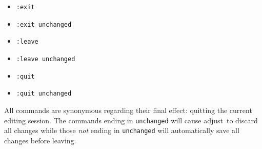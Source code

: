 \documentclass[11pt, a4paper, british]{scrartcl}
\DeclareRobustCommand{\adjust}{\textsf{adjust}}
\begin{document}
\begin{itemize}
\item \texttt{:exit}
\item \texttt{:exit unchanged}
\item \texttt{:leave}
\item \texttt{:leave unchanged}
\item \texttt{:quit}
\item \texttt{:quit unchanged}
\end{itemize}

All commands are synonymous regarding their final effect:  quitting the current
editing session.  The commands ending in \texttt{unchanged} will cause \adjust \
to discard all changes while those \emph{not} ending in \texttt{unchanged} will
automatically save all changes before leaving.
\end{document}
